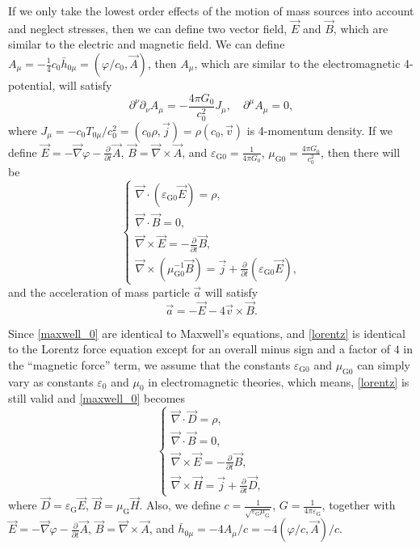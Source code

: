 \documentclass{article}
\def\p{\partial}
\begin{document}
If we only take the lowest order effects of the motion of mass sources into account and neglect stresses, then we can define two vector field, $\vec{E}$ and $\vec{B}$, which are similar to the electric and magnetic field. We can define $A_\mu=-\frac{1}{4}c_0\bar{h}_{0 \mu}=(\varphi/c_0,\vec{A})$, then $A_\mu$, which are similar to the electromagnetic 4-potential, will satisfy
\begin{equation}
    \p^\nu\p_\nu A_\mu=-\frac{4\pi G_0}{c_0^2}J_\mu,\quad\p^\mu A_\mu=0,
\end{equation}
where $J_\mu=-c_0T_{0 \mu}/c_0^2=(c_0\rho,\vec{j})=\rho(c_0,\vec{v})$ is 4-momentum density. If we define $\vec{E}=-\vec{\nabla}\varphi-\frac{\p}{\p t}\vec{A}$, $\vec{B}=\vec{\nabla}\times\vec{A}$, and $\varepsilon_{\text{G}0}=\frac{1}{4\pi G_0}$, $\mu_{\text{G}0}=\frac{4\pi G_0}{c_0^2}$, then there will be
\begin{equation}\label{maxwell_0}
    \begin{cases}
        \vec{\nabla}\cdot(\varepsilon_{\text{G}0}\vec{E})=\rho,\\
        \vec{\nabla}\cdot\vec{B}=0,\\
        \vec{\nabla}\times\vec{E}=-\frac{\p}{\p t}\vec{B},\\
        \vec{\nabla}\times(\mu_{\text{G}0}^{-1}\vec{B})=\vec{j}+\frac{\p}{\p t}(\varepsilon_{\text{G}0}\vec{E}),
    \end{cases}
\end{equation}
and the acceleration of mass particle $\vec{a}$ will satisfy
\begin{equation}\label{lorentz}
    \vec{a}=-\vec{E}-4\vec{v}\times\vec{B}.
\end{equation}

Since \eqref{maxwell_0} are identical to Maxwell's equations, and \eqref{lorentz} is identical to the Lorentz force equation except for an overall minus sign and a factor of $4$ in the ``magnetic force'' term, we assume that the constants $\varepsilon_{\text{G}0}$ and $\mu_{\text{G}0}$ can simply vary as constants $\varepsilon_{0}$ and $\mu_{0}$ in electromagnetic theories, which means, \eqref{lorentz} is still valid and \eqref{maxwell_0} becomes
\begin{equation}\label{maxwell}
    \begin{cases}
        \vec{\nabla}\cdot\vec{D}=\rho,\\
        \vec{\nabla}\cdot\vec{B}=0,\\
        \vec{\nabla}\times\vec{E}=-\frac{\p}{\p t}\vec{B},\\
        \vec{\nabla}\times\vec{H}=\vec{j}+\frac{\p}{\p t}\vec{D},
    \end{cases}
\end{equation}
where $\vec{D}=\varepsilon_{\text{G}}\vec{E}$, $\vec{B}=\mu_{\text{G}}\vec{H}$. Also, we define $c=\frac{1}{\sqrt{\varepsilon_{\text{G}}\mu_{\text{G}}}}$, $G=\frac{1}{4\pi\varepsilon_{\text{G}}}$, together with $\vec{E}=-\vec{\nabla}\varphi-\frac{\p}{\p t}\vec{A}$, $\vec{B}=\vec{\nabla}\times\vec{A}$, and $\bar{h}_{0 \mu}=-4A_\mu/c=-4(\varphi/c,\vec{A})/c$.
\end{document}
